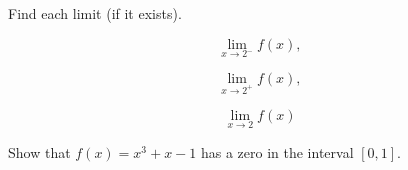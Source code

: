 \documentclass[11pt]{exam}
\begin{document}
\begin{questions}
Find each limit (if it exists).

\begin{minipage}{.3\linewidth}
\begin{equation*}
 \lim_{x\to 2^{-}}f(x),
\end{equation*}
\end{minipage}%
\begin{minipage}{.3\linewidth}
\begin{equation*}
 \lim_{x\to 2^{+}}f(x),
\end{equation*}
\end{minipage}%
\begin{minipage}{.3\linewidth}
\begin{equation*}
 \lim_{x\to 2}f(x)
\end{equation*}
\end{minipage}

\vfill

\question[15]
Show that $f(x)=x^{3}+x-1$ has a zero in the interval $[0,1]$.

\vfill






\end{questions}
\end{document}
